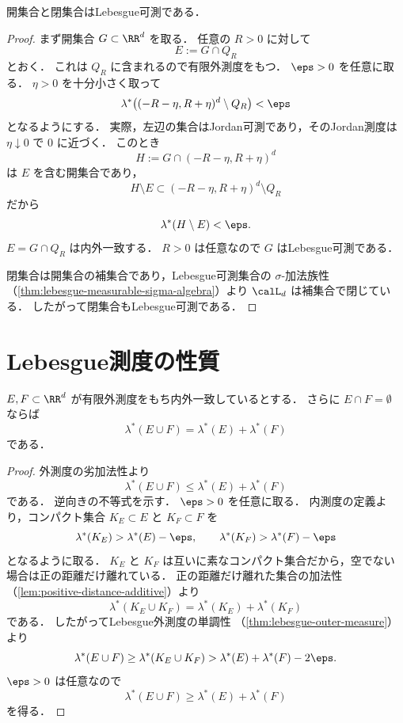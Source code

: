 \begin{theorem}[開集合と閉集合]\label{thm:open-closed-lebesgue-measurable}
開集合と閉集合はLebesgue可測である．
\end{theorem}
\begin{proof}
まず開集合 $G\subset\RR^d$ を取る．
任意の $R>0$ に対して
\[
E:=G\cap Q_R
\]
とおく．
これは $Q_R$ に含まれるので有限外測度をもつ．
$\eps>0$ を任意に取る．
$\eta>0$ を十分小さく取って
\[
\lambda^*\bigl((-R-\eta,R+\eta)^d\setminus Q_R\bigr)<\eps
\]
となるようにする．
実際，左辺の集合はJordan可測であり，そのJordan測度は $\eta\downarrow0$ で $0$ に近づく．
このとき
\[
H:=G\cap(-R-\eta,R+\eta)^d
\]
は $E$ を含む開集合であり，
\[
H\setminus E
\subset
(-R-\eta,R+\eta)^d\setminus Q_R
\]
だから
\[
\lambda^*(H\setminus E)<\eps.
\]
$E=G\cap Q_R$ は内外一致する．
$R>0$ は任意なので $G$ はLebesgue可測である．

閉集合は開集合の補集合であり，Lebesgue可測集合の $\sigma$-加法族性
（\cref{thm:lebesgue-measurable-sigma-algebra}）より $\calL_d$ は補集合で閉じている．
したがって閉集合もLebesgue可測である．
\end{proof}

\section{Lebesgue測度の性質}

\begin{lemma}[有限外測度での有限加法性]\label{lem:finite-outer-measure-finite-additivity}
$E,F\subset\RR^d$ が有限外測度をもち内外一致しているとする．
さらに $E\cap F=\emptyset$ ならば
\[
\lambda^*(E\cup F)=\lambda^*(E)+\lambda^*(F)
\]
である．
\end{lemma}
\begin{proof}
外測度の劣加法性より
\[
\lambda^*(E\cup F)\le \lambda^*(E)+\lambda^*(F)
\]
である．
逆向きの不等式を示す．
$\eps>0$ を任意に取る．
内測度の定義より，コンパクト集合 $K_E\subset E$ と $K_F\subset F$ を
\[
\lambda^*(K_E)>\lambda^*(E)-\eps,
\qquad
\lambda^*(K_F)>\lambda^*(F)-\eps
\]
となるように取る．
$K_E$ と $K_F$ は互いに素なコンパクト集合だから，空でない場合は正の距離だけ離れている．
正の距離だけ離れた集合の加法性（\cref{lem:positive-distance-additive}）より
\[
\lambda^*(K_E\cup K_F)=\lambda^*(K_E)+\lambda^*(K_F)
\]
である．
したがってLebesgue外測度の単調性
（\cref{thm:lebesgue-outer-measure}）より
\[
\lambda^*(E\cup F)
\ge
\lambda^*(K_E\cup K_F)
>
\lambda^*(E)+\lambda^*(F)-2\eps.
\]
$\eps>0$ は任意なので
\[
\lambda^*(E\cup F)\ge \lambda^*(E)+\lambda^*(F)
\]
を得る．
\end{proof}

